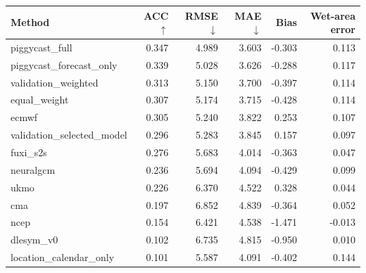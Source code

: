 \begin{tabular}{lrrrrr}
\toprule
Method & ACC $\uparrow$ & RMSE $\downarrow$ & MAE $\downarrow$ & Bias & Wet-area error \\
\midrule
piggycast\_full & 0.347 & 4.989 & 3.603 & -0.303 & 0.113 \\
piggycast\_forecast\_only & 0.339 & 5.028 & 3.626 & -0.288 & 0.117 \\
validation\_weighted & 0.313 & 5.150 & 3.700 & -0.397 & 0.114 \\
equal\_weight & 0.307 & 5.174 & 3.715 & -0.428 & 0.114 \\
ecmwf & 0.305 & 5.240 & 3.822 & 0.253 & 0.107 \\
validation\_selected\_model & 0.296 & 5.283 & 3.845 & 0.157 & 0.097 \\
fuxi\_s2s & 0.276 & 5.683 & 4.014 & -0.363 & 0.047 \\
neuralgcm & 0.236 & 5.694 & 4.094 & -0.429 & 0.099 \\
ukmo & 0.226 & 6.370 & 4.522 & 0.328 & 0.044 \\
cma & 0.197 & 6.852 & 4.839 & -0.364 & 0.052 \\
ncep & 0.154 & 6.421 & 4.538 & -1.471 & -0.013 \\
dlesym\_v0 & 0.102 & 6.735 & 4.815 & -0.950 & 0.010 \\
location\_calendar\_only & 0.101 & 5.587 & 4.091 & -0.402 & 0.144 \\
\bottomrule
\end{tabular}
